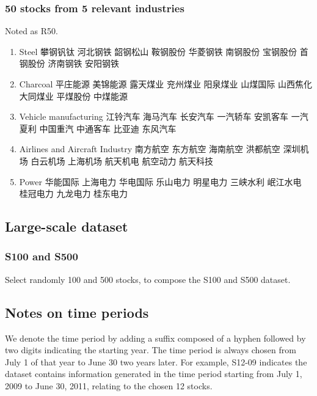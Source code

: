 \documentclass[12pt,a4paper]{article}
\begin{document}
\begin{CJK*}{UTF8}{song}
\subsubsection{50 stocks from 5 relevant industries}
Noted as R50.
\begin{multicols}{2}
\begin{enumerate}
\item Steel
 攀钢钒钛
 河北钢铁
 韶钢松山
 鞍钢股份
 华菱钢铁
 南钢股份
 宝钢股份
 首钢股份
 济南钢铁
 安阳钢铁
\item Charcoal
 平庄能源
 美锦能源
 露天煤业
 兖州煤业
 阳泉煤业
 山煤国际
 山西焦化
 大同煤业
 平煤股份
 中煤能源
\item Vehicle manufacturing
 江铃汽车
 海马汽车
 长安汽车
 一汽轿车
 安凯客车
 一汽夏利
 中国重汽
 中通客车
 比亚迪
 东风汽车
\item Airlines and Aircraft Industry
 南方航空
 东方航空
 海南航空
 洪都航空
 深圳机场
 白云机场
 上海机场
 航天机电
 航空动力
 航天科技
\item Power
 华能国际
 上海电力
 华电国际
 乐山电力
 明星电力
 三峡水利
 岷江水电
 桂冠电力
 九龙电力
 桂东电力
\end{enumerate}
\end{multicols}

\subsection{Large-scale dataset}
\subsubsection{S100 and S500}
Select randomly 100 and 500 stocks, to compose the S100 and S500 dataset.

\subsection{Notes on time periods}
We denote the time period by adding a suffix composed of a hyphen followed by two digits indicating the starting year. The time period is always chosen from July 1 of that year to June 30 two years later. For example, S12-09 indicates the dataset contains information generated in the time period starting from July 1, 2009 to June 30, 2011, relating to the chosen 12 stocks.


\end{CJK*}
\end{document}

